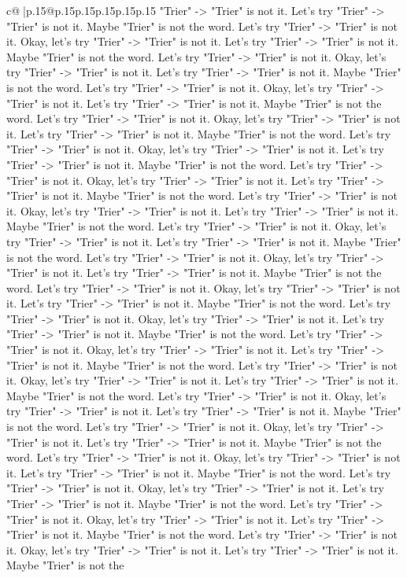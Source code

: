 \documentclass{article}
\begin{document}
{\begin{supertabular}{c@{$\;$}|p{.15\linewidth}@{}p{.15\linewidth}p{.15\linewidth}p{.15\linewidth}p{.15\linewidth}p{.15\linewidth}}
{{{"Trier" {-}> "Trier" is not it. Let's try "Trier" {-}> "Trier" is not it. Maybe "Trier" is not the word. Let's try "Trier" {-}> "Trier" is not it. Okay, let's try "Trier" {-}> "Trier" is not it. Let's try "Trier" {-}> "Trier" is not it. Maybe "Trier" is not the word. Let's try "Trier" {-}> "Trier" is not it. Okay, let's try "Trier" {-}> "Trier" is not it. Let's try "Trier" {-}> "Trier" is not it. Maybe "Trier" is not the word. Let's try "Trier" {-}> "Trier" is not it. Okay, let's try "Trier" {-}> "Trier" is not it. Let's try "Trier" {-}> "Trier" is not it. Maybe "Trier" is not the word. Let's try "Trier" {-}> "Trier" is not it. Okay, let's try "Trier" {-}> "Trier" is not it. Let's try "Trier" {-}> "Trier" is not it. Maybe "Trier" is not the word. Let's try "Trier" {-}> "Trier" is not it. Okay, let's try "Trier" {-}> "Trier" is not it. Let's try "Trier" {-}> "Trier" is not it. Maybe "Trier" is not the word. Let's try "Trier" {-}> "Trier" is not it. Okay, let's try "Trier" {-}> "Trier" is not it. Let's try "Trier" {-}> "Trier" is not it. Maybe "Trier" is not the word. Let's try "Trier" {-}> "Trier" is not it. Okay, let's try "Trier" {-}> "Trier" is not it. Let's try "Trier" {-}> "Trier" is not it. Maybe "Trier" is not the word. Let's try "Trier" {-}> "Trier" is not it. Okay, let's try "Trier" {-}> "Trier" is not it. Let's try "Trier" {-}> "Trier" is not it. Maybe "Trier" is not the word. Let's try "Trier" {-}> "Trier" is not it. Okay, let's try "Trier" {-}> "Trier" is not it. Let's try "Trier" {-}> "Trier" is not it. Maybe "Trier" is not the word. Let's try "Trier" {-}> "Trier" is not it. Okay, let's try "Trier" {-}> "Trier" is not it. Let's try "Trier" {-}> "Trier" is not it. Maybe "Trier" is not the word. Let's try "Trier" {-}> "Trier" is not it. Okay, let's try "Trier" {-}> "Trier" is not it. Let's try "Trier" {-}> "Trier" is not it. Maybe "Trier" is not the word. Let's try "Trier" {-}> "Trier" is not it. Okay, let's try "Trier" {-}> "Trier" is not it. Let's try "Trier" {-}> "Trier" is not it. Maybe "Trier" is not the word. Let's try "Trier" {-}> "Trier" is not it. Okay, let's try "Trier" {-}> "Trier" is not it. Let's try "Trier" {-}> "Trier" is not it. Maybe "Trier" is not the word. Let's try "Trier" {-}> "Trier" is not it. Okay, let's try "Trier" {-}> "Trier" is not it. Let's try "Trier" {-}> "Trier" is not it. Maybe "Trier" is not the word. Let's try "Trier" {-}> "Trier" is not it. Okay, let's try "Trier" {-}> "Trier" is not it. Let's try "Trier" {-}> "Trier" is not it. Maybe "Trier" is not the word. Let's try "Trier" {-}> "Trier" is not it. Okay, let's try "Trier" {-}> "Trier" is not it. Let's try "Trier" {-}> "Trier" is not it. Maybe "Trier" is not the word. Let's try "Trier" {-}> "Trier" is not it. Okay, let's try "Trier" {-}> "Trier" is not it. Let's try "Trier" {-}> "Trier" is not it. Maybe "Trier" is not the word. Let's try "Trier" {-}> "Trier" is not it. Okay, let's try "Trier" {-}> "Trier" is not it. Let's try "Trier" {-}> "Trier" is not it. Maybe "Trier" is not the word. Let's try "Trier" {-}> "Trier" is not it. Okay, let's try "Trier" {-}> "Trier" is not it. Let's try "Trier" {-}> "Trier" is not it. Maybe "Trier" is not the }}}
\end{supertabular}}
\end{document}

